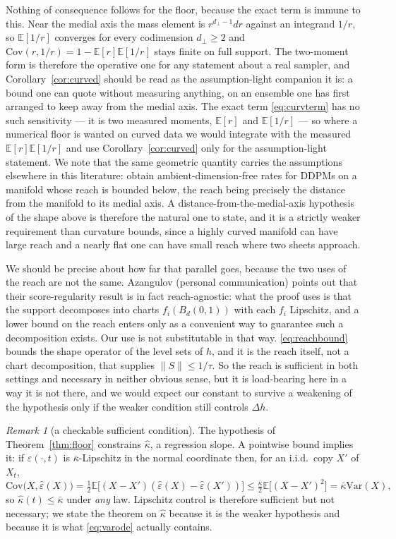 \documentclass[11pt]{article}
\theoremstyle{remark}
\newtheorem{remark}{Remark}
\newcommand{\kb}{\bar\kappa}
\newcommand{\epshat}{\hat\varepsilon}
\newcommand{\E}{\mathbb{E}}
\newcommand{\Var}{\mathrm{Var}}
\newcommand{\Cov}{\mathrm{Cov}}
\begin{document}
Nothing of consequence follows for the floor, because the exact term is immune to this. Near
the medial axis the mass element is $r^{d_\perp-1}dr$ against an integrand $1/r$, so
$\E[1/r]$ converges for every codimension $d_\perp\ge2$ and $\Cov(r,1/r)=1-\E[r]\E[1/r]$
stays finite on full support. The two-moment form is therefore the operative one for any
statement about a real sampler, and Corollary~\ref{cor:curved} should be read as the
assumption-light companion it is: a bound one can quote without measuring anything, on an
ensemble one has first arranged to keep away from the medial axis. The exact term \eqref{eq:curvterm} has no such
sensitivity --- it is two measured moments, $\E[r]$ and $\E[1/r]$ --- so where a numerical
floor is wanted on curved data we would integrate with the measured $\E[r]\E[1/r]$ and use
Corollary~\ref{cor:curved} only for the assumption-light statement. We note that the same
geometric quantity carries the assumptions elsewhere in this literature:
\citet{azangulov2025convergence} obtain ambient-dimension-free rates for DDPMs on a manifold
whose reach is bounded below, the reach being precisely the distance from the manifold to
its medial axis. A distance-from-the-medial-axis hypothesis of the shape above is therefore
the natural one to state, and it is a strictly weaker requirement than curvature bounds,
since a highly curved manifold can have large reach and a nearly flat one can have small
reach where two sheets approach.

We should be precise about how far that parallel goes, because the two uses of the reach are
not the same. Azangulov (personal communication) points out that their score-regularity
result is in fact reach-agnostic: what the proof uses is that the support decomposes into
charts $f_i(B_d(0,1))$ with each $f_i$ Lipschitz, and a lower bound on the reach enters only
as a convenient way to guarantee such a decomposition exists. Our use is not substitutable in
that way. \eqref{eq:reachbound} bounds the shape operator of the level sets of $h$, and it is
the reach itself, not a chart decomposition, that supplies $\|S\|\le1/\tau$. So the reach is
sufficient in both settings and necessary in neither obvious sense, but it is load-bearing
here in a way it is not there, and we would expect our constant to survive a weakening of the
hypothesis only if the weaker condition still controls $\Delta h$.

\begin{remark}[a checkable sufficient condition]\label{rem:lip}
The hypothesis of Theorem~\ref{thm:floor} constrains $\hat\kappa$, a regression slope. A
pointwise bound implies it: if $\epshat(\cdot,t)$ is $\kb$-Lipschitz in the normal
coordinate then, for an i.i.d.\ copy $X'$ of $X_t$,
\[
\Cov\big(X,\epshat(X)\big)=\tfrac12\E\big[(X-X')(\epshat(X)-\epshat(X'))\big]
\le\tfrac{\kb}{2}\E\big[(X-X')^2\big]=\kb\Var(X),
\]
so $\hat\kappa(t)\le\kb$ under \emph{any} law. Lipschitz control is therefore sufficient
but not necessary; we state the theorem on $\hat\kappa$ because it is the weaker hypothesis
and because it is what \eqref{eq:varode} actually contains.
\end{remark}
\end{document}
